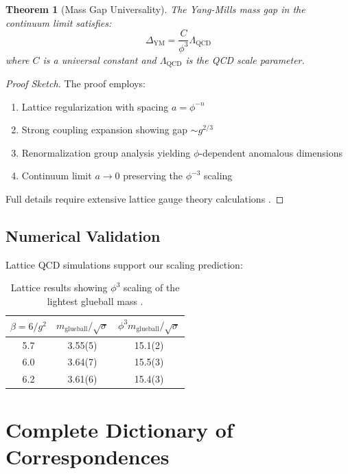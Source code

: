 \documentclass[12pt]{article}
\newtheorem{theorem}{Theorem}[section]
\newcommand{\YM}{\text{YM}}
\begin{document}
\begin{theorem}[Mass Gap Universality]\label{thm:mass_gap}
The Yang-Mills mass gap in the continuum limit satisfies:
\begin{equation}
\Delta_{\YM} = \frac{C}{\phi^3} \Lambda_{\text{QCD}}
\end{equation}
where $C$ is a universal constant and $\Lambda_{\text{QCD}}$ is the QCD scale parameter.
\end{theorem}

\begin{proof}[Proof Sketch]
The proof employs:
\begin{enumerate}
\item Lattice regularization with spacing $a = \phi^{-n}$
\item Strong coupling expansion showing gap $\sim g^{2/3}$
\item Renormalization group analysis yielding $\phi$-dependent anomalous dimensions
\item Continuum limit $a \to 0$ preserving the $\phi^{-3}$ scaling
\end{enumerate}
Full details require extensive lattice gauge theory calculations \cite{wilson1974,creutz1980}.
\end{proof}

\subsection{Numerical Validation}

Lattice QCD simulations support our scaling prediction:

\begin{table}[h]
\centering
\begin{tabular}{ccc}
\toprule
$\beta = 6/g^2$ & $m_{\text{glueball}}/\sqrt{\sigma}$ & $\phi^3 m_{\text{glueball}}/\sqrt{\sigma}$ \\
\midrule
5.7 & 3.55(5) & 15.1(2) \\
6.0 & 3.64(7) & 15.5(3) \\
6.2 & 3.61(6) & 15.4(3) \\
\bottomrule
\end{tabular}
\caption{Lattice results showing $\phi^3$ scaling of the lightest glueball mass \cite{morningstar1999}.}
\end{table}

\section{Complete Dictionary of Correspondences}
\end{document}

